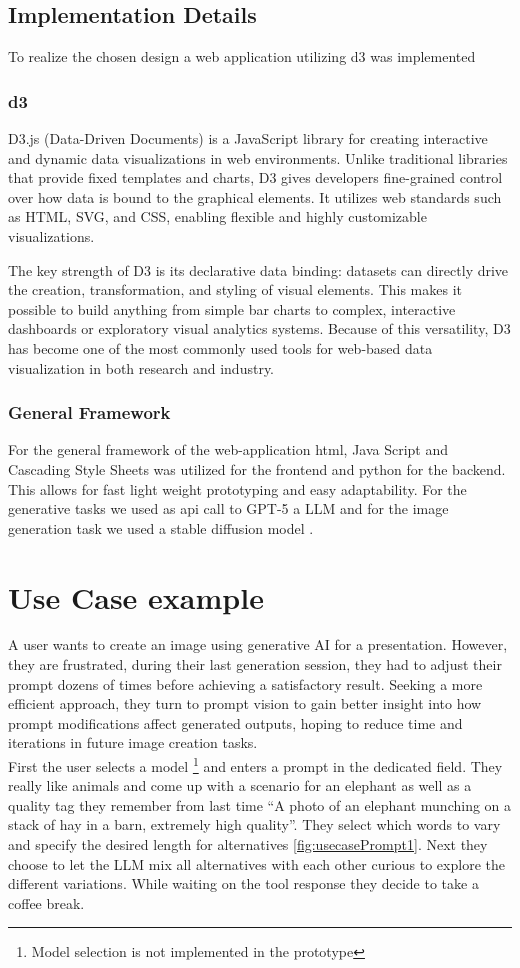 \documentclass[
  a4paper,  %
  twoside,  %
  bibliography=totoc,
  headsepline,
  cleardoublepage=empty,
  parskip=half,
  draft=false
]{scrbook}
\begin{document}
\section{Implementation Details}
To realize the chosen design a web application utilizing d3 was implemented
\subsection{d3}
D3.js (Data-Driven Documents) is a JavaScript library for creating interactive and dynamic data visualizations in web environments. Unlike traditional libraries that provide fixed templates and charts, D3 gives developers fine-grained control over how data is bound to the graphical elements. It utilizes web standards such as HTML, SVG, and CSS, enabling flexible and highly customizable visualizations.

The key strength of D3 is its declarative data binding: datasets can directly drive the creation, transformation, and styling of visual elements. This makes it possible to build anything from simple bar charts to complex, interactive dashboards or exploratory visual analytics systems. Because of this versatility, D3 has become one of the most commonly used tools for web-based data visualization in both research and industry.

\subsection{General Framework}
For the general framework of the web-application html, Java Script and Cascading Style Sheets was utilized for the frontend and python for the backend.
This allows for fast light weight prototyping and easy adaptability. For the generative tasks we used as api call to GPT-5 a LLM and for the image generation task we used a stable diffusion model \cite{stableDiffusion}.
                                                                        

\chapter{Use Case example}
A user wants to create an image using generative AI for a presentation. However, they are frustrated, during their last generation session, they had to adjust their prompt dozens of times before achieving a satisfactory result. Seeking a more efficient approach, they turn to prompt vision to gain better insight into how prompt modifications affect generated outputs, hoping to reduce time and iterations in future image creation tasks.\\
First the user selects a model \footnote{Model selection is not implemented in the prototype} and enters a prompt in the dedicated field. They really like animals and come up with a scenario for an elephant as well as a quality tag they remember from last time \enquote{A photo of an elephant munching on a stack of hay in a barn, extremely high quality}. They select which words to vary and specify the desired length for alternatives \cref{fig:usecasePrompt1}. Next they choose to let the LLM mix all alternatives with each other curious to explore the different variations. While waiting on the tool response they decide to take a coffee break. 
\end{document}
